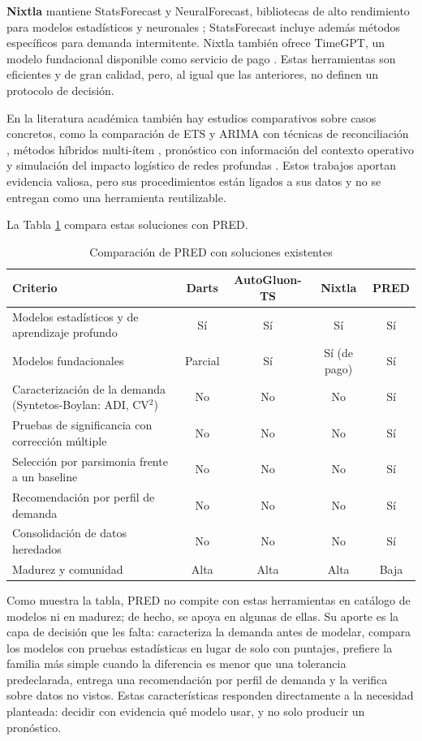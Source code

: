 \textbf{Nixtla} mantiene StatsForecast y NeuralForecast, bibliotecas de alto rendimiento para modelos estadísticos y neuronales \cite{neuralforecast}; StatsForecast incluye además métodos específicos para demanda intermitente. Nixtla también ofrece TimeGPT, un modelo fundacional disponible como servicio de pago \cite{timegpt}. Estas herramientas son eficientes y de gran calidad, pero, al igual que las anteriores, no definen un protocolo de decisión.

En la literatura académica también hay estudios comparativos sobre casos concretos, como la comparación de ETS y ARIMA con técnicas de reconciliación \cite{rambing}, métodos híbridos multi-ítem \cite{lingkon}, pronóstico con información del contexto operativo \cite{ma} y simulación del impacto logístico de redes profundas \cite{krzy}. Estos trabajos aportan evidencia valiosa, pero sus procedimientos están ligados a sus datos y no se entregan como una herramienta reutilizable.

La Tabla \ref{tab:alternativas} compara estas soluciones con PRED.

\begin{table}[ht]
\centering
\small
\begin{tabular}{|p{4.6cm}|c|c|c|c|}
\hline
\textbf{Criterio} & \textbf{Darts} & \textbf{AutoGluon-TS} & \textbf{Nixtla} & \textbf{PRED} \\ \hline
Modelos estadísticos y de aprendizaje profundo & Sí & Sí & Sí & Sí \\ \hline
Modelos fundacionales & Parcial & Sí & Sí (de pago) & Sí \\ \hline
Caracterización de la demanda (Syntetos-Boylan: ADI, CV$^2$) & No & No & No & Sí \\ \hline
Pruebas de significancia con corrección múltiple & No & No & No & Sí \\ \hline
Selección por parsimonia frente a un baseline & No & No & No & Sí \\ \hline
Recomendación por perfil de demanda & No & No & No & Sí \\ \hline
Consolidación de datos heredados & No & No & No & Sí \\ \hline
Madurez y comunidad & Alta & Alta & Alta & Baja \\ \hline
\end{tabular}
\caption{Comparación de PRED con soluciones existentes}
\label{tab:alternativas}
\end{table}
\vspace{1cm}
Como muestra la tabla, PRED no compite con estas herramientas en catálogo de modelos ni en madurez; de hecho, se apoya en algunas de ellas. Su aporte es la capa de decisión que les falta: caracteriza la demanda antes de modelar, compara los modelos con pruebas estadísticas en lugar de solo con puntajes, prefiere la familia más simple cuando la diferencia es menor que una tolerancia predeclarada, entrega una recomendación por perfil de demanda y la verifica sobre datos no vistos. Estas características responden directamente a la necesidad planteada: decidir con evidencia qué modelo usar, y no solo producir un pronóstico.
